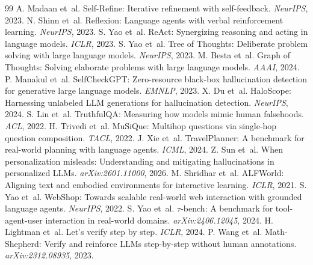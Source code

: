 \documentclass{article}
\begin{document}

\begin{thebibliography}{99}
 A. Madaan et~al. Self-Refine: Iterative refinement with self-feedback. \emph{NeurIPS}, 2023.
 N. Shinn et~al. Reflexion: Language agents with verbal reinforcement learning. \emph{NeurIPS}, 2023.
 S. Yao et~al. ReAct: Synergizing reasoning and acting in language models. \emph{ICLR}, 2023.
 S. Yao et~al. Tree of Thoughts: Deliberate problem solving with large language models. \emph{NeurIPS}, 2023.
 M. Besta et~al. Graph of Thoughts: Solving elaborate problems with large language models. \emph{AAAI}, 2024.
 P. Manakul et~al. SelfCheckGPT: Zero-resource black-box hallucination detection for generative large language models. \emph{EMNLP}, 2023.
 X. Du et~al. HaloScope: Harnessing unlabeled LLM generations for hallucination detection. \emph{NeurIPS}, 2024.
 S. Lin et~al. TruthfulQA: Measuring how models mimic human falsehoods. \emph{ACL}, 2022.
 H. Trivedi et~al. MuSiQue: Multihop questions via single-hop question composition. \emph{TACL}, 2022.
 J. Xie et~al. TravelPlanner: A benchmark for real-world planning with language agents. \emph{ICML}, 2024.
 Z. Sun et~al. When personalization misleads: Understanding and mitigating hallucinations in personalized LLMs. \emph{arXiv:2601.11000}, 2026.
 M. Shridhar et~al. ALFWorld: Aligning text and embodied environments for interactive learning. \emph{ICLR}, 2021.
 S. Yao et~al. WebShop: Towards scalable real-world web interaction with grounded language agents. \emph{NeurIPS}, 2022.
 S. Yao et~al. $\tau$-bench: A benchmark for tool-agent-user interaction in real-world domains. \emph{arXiv:2406.12045}, 2024.
 H. Lightman et~al. Let's verify step by step. \emph{ICLR}, 2024.
 P. Wang et~al. Math-Shepherd: Verify and reinforce LLMs step-by-step without human annotations. \emph{arXiv:2312.08935}, 2023.

\end{thebibliography}
\end{document}
